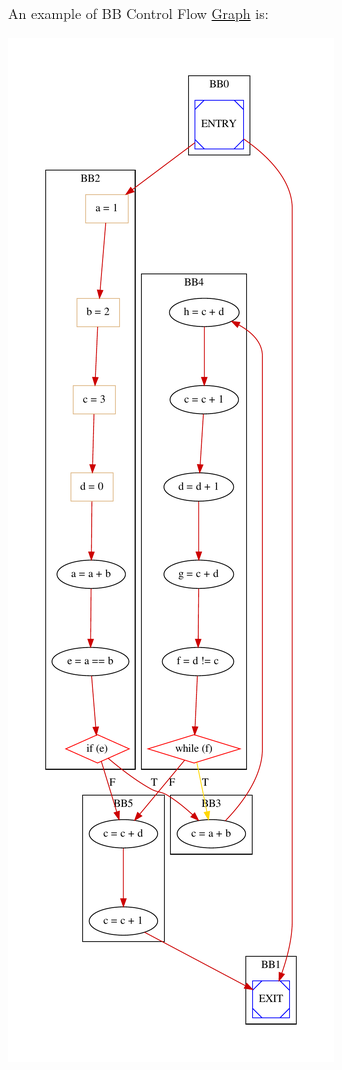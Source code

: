 An example of BB Control Flow \hyperlink{structGraph}{Graph} is\+: 
\begin{DoxyImageNoCaption}
  \mbox{\includegraphics[width=\textwidth,height=\textheight/2,keepaspectratio=true]{dot_inline_dotgraph_9}}
\end{DoxyImageNoCaption}


